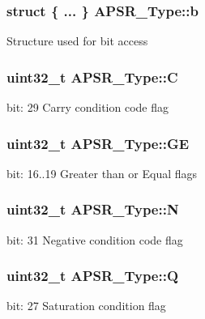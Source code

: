 \subsubsection[{\texorpdfstring{b}{b}}]{\setlength{\rightskip}{0pt plus 5cm}struct \{ ... \}   A\+P\+S\+R\+\_\+\+Type\+::b}\hypertarget{unionAPSR__Type_a708e73cf8aa10a405c9d236d3c7e389c}{}\label{unionAPSR__Type_a708e73cf8aa10a405c9d236d3c7e389c}
Structure used for bit access 
\subsubsection[{\texorpdfstring{C}{C}}]{\setlength{\rightskip}{0pt plus 5cm}uint32\+\_\+t A\+P\+S\+R\+\_\+\+Type\+::C}\hypertarget{unionAPSR__Type_a86e2c5b891ecef1ab55b1edac0da79a6}{}\label{unionAPSR__Type_a86e2c5b891ecef1ab55b1edac0da79a6}
bit\+: 29 Carry condition code flag 
\subsubsection[{\texorpdfstring{GE}{GE}}]{\setlength{\rightskip}{0pt plus 5cm}uint32\+\_\+t A\+P\+S\+R\+\_\+\+Type\+::\+GE}\hypertarget{unionAPSR__Type_adcb98a5b9c93b0cb69cdb7af5638f32e}{}\label{unionAPSR__Type_adcb98a5b9c93b0cb69cdb7af5638f32e}
bit\+: 16..19 Greater than or Equal flags 
\subsubsection[{\texorpdfstring{N}{N}}]{\setlength{\rightskip}{0pt plus 5cm}uint32\+\_\+t A\+P\+S\+R\+\_\+\+Type\+::N}\hypertarget{unionAPSR__Type_a7e7bbba9b00b0bb3283dc07f1abe37e0}{}\label{unionAPSR__Type_a7e7bbba9b00b0bb3283dc07f1abe37e0}
bit\+: 31 Negative condition code flag 
\subsubsection[{\texorpdfstring{Q}{Q}}]{\setlength{\rightskip}{0pt plus 5cm}uint32\+\_\+t A\+P\+S\+R\+\_\+\+Type\+::Q}\hypertarget{unionAPSR__Type_a22d10913489d24ab08bd83457daa88de}{}\label{unionAPSR__Type_a22d10913489d24ab08bd83457daa88de}
bit\+: 27 Saturation condition flag 
